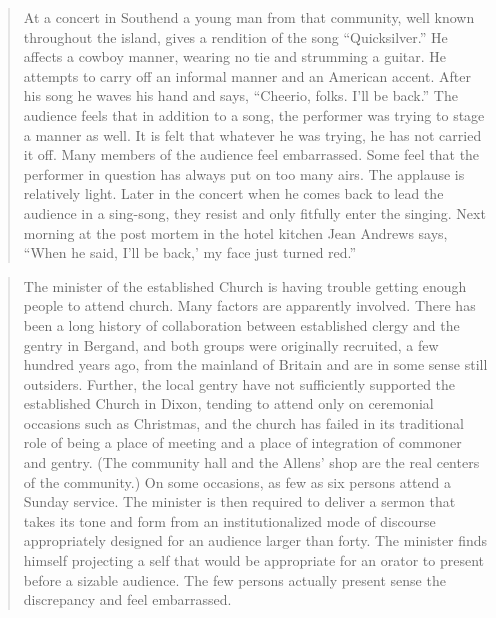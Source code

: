\documentclass[openany,nobib]{tufte-book}
\begin{document}
\begin{quote}
At a concert in Southend a young man from that community, well known
throughout the island, gives a rendition of the song ``Quicksilver.'' He
affects a cowboy manner, wearing no tie and strumming a guitar. He
attempts to carry off an informal manner and an American accent. After
his song he waves his hand and says, ``Cheerio, folks. I'll be back.''
The audience feels that in addition to a song, the performer was trying
to stage a manner as well. It is felt that whatever he was trying, he
has not carried it off. Many members of the audience feel embarrassed.
Some feel that the performer in question has always put on too many
airs. The applause is relatively light. Later in the concert when he
comes back to lead the audience in a sing-song, they resist and only
fitfully enter the singing. Next morning at the post mortem in the hotel
kitchen Jean Andrews says, ``When he said, I'll be back,' my face just
turned red.''
\end{quote}

\begin{quote}
The minister of the established Church is having trouble getting enough
people to attend church. Many factors are apparently involved. There has
been a long history of collaboration between established clergy and the
gentry in Bergand, and both groups were originally recruited, a few
hundred years ago, from the mainland of Britain and are in some sense
still outsiders. Further, the local gentry have not sufficiently
supported the established Church in Dixon, tending to attend only on
ceremonial occasions such as Christmas, and the church has failed in its
traditional role of being a place of meeting and a place of integration
of commoner and gentry. (The community hall and the Allens' shop are the
real centers of the community.) On some occasions, as few as six persons
attend a Sunday service. The minister is then required to deliver a
sermon that takes its tone and form from an institutionalized mode of
discourse appropriately designed for an audience larger than forty. The
minister finds himself projecting a self that would be appropriate for
an orator to present before a sizable audience. The few persons actually
present sense the discrepancy and feel embarrassed.
\end{quote}
\end{document}
